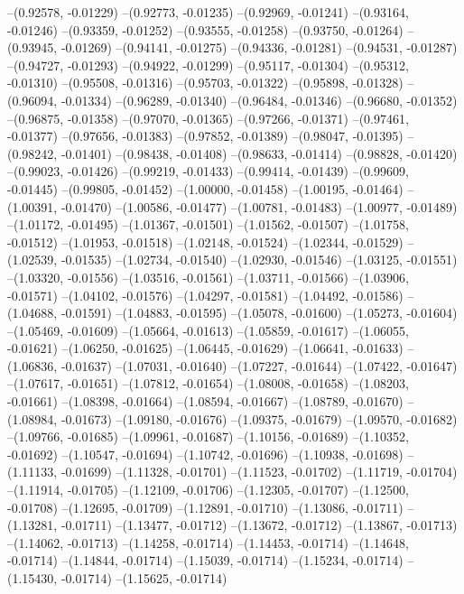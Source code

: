 --(0.92578, -0.01229)
--(0.92773, -0.01235)
--(0.92969, -0.01241)
--(0.93164, -0.01246)
--(0.93359, -0.01252)
--(0.93555, -0.01258)
--(0.93750, -0.01264)
--(0.93945, -0.01269)
--(0.94141, -0.01275)
--(0.94336, -0.01281)
--(0.94531, -0.01287)
--(0.94727, -0.01293)
--(0.94922, -0.01299)
--(0.95117, -0.01304)
--(0.95312, -0.01310)
--(0.95508, -0.01316)
--(0.95703, -0.01322)
--(0.95898, -0.01328)
--(0.96094, -0.01334)
--(0.96289, -0.01340)
--(0.96484, -0.01346)
--(0.96680, -0.01352)
--(0.96875, -0.01358)
--(0.97070, -0.01365)
--(0.97266, -0.01371)
--(0.97461, -0.01377)
--(0.97656, -0.01383)
--(0.97852, -0.01389)
--(0.98047, -0.01395)
--(0.98242, -0.01401)
--(0.98438, -0.01408)
--(0.98633, -0.01414)
--(0.98828, -0.01420)
--(0.99023, -0.01426)
--(0.99219, -0.01433)
--(0.99414, -0.01439)
--(0.99609, -0.01445)
--(0.99805, -0.01452)
--(1.00000, -0.01458)
--(1.00195, -0.01464)
--(1.00391, -0.01470)
--(1.00586, -0.01477)
--(1.00781, -0.01483)
--(1.00977, -0.01489)
--(1.01172, -0.01495)
--(1.01367, -0.01501)
--(1.01562, -0.01507)
--(1.01758, -0.01512)
--(1.01953, -0.01518)
--(1.02148, -0.01524)
--(1.02344, -0.01529)
--(1.02539, -0.01535)
--(1.02734, -0.01540)
--(1.02930, -0.01546)
--(1.03125, -0.01551)
--(1.03320, -0.01556)
--(1.03516, -0.01561)
--(1.03711, -0.01566)
--(1.03906, -0.01571)
--(1.04102, -0.01576)
--(1.04297, -0.01581)
--(1.04492, -0.01586)
--(1.04688, -0.01591)
--(1.04883, -0.01595)
--(1.05078, -0.01600)
--(1.05273, -0.01604)
--(1.05469, -0.01609)
--(1.05664, -0.01613)
--(1.05859, -0.01617)
--(1.06055, -0.01621)
--(1.06250, -0.01625)
--(1.06445, -0.01629)
--(1.06641, -0.01633)
--(1.06836, -0.01637)
--(1.07031, -0.01640)
--(1.07227, -0.01644)
--(1.07422, -0.01647)
--(1.07617, -0.01651)
--(1.07812, -0.01654)
--(1.08008, -0.01658)
--(1.08203, -0.01661)
--(1.08398, -0.01664)
--(1.08594, -0.01667)
--(1.08789, -0.01670)
--(1.08984, -0.01673)
--(1.09180, -0.01676)
--(1.09375, -0.01679)
--(1.09570, -0.01682)
--(1.09766, -0.01685)
--(1.09961, -0.01687)
--(1.10156, -0.01689)
--(1.10352, -0.01692)
--(1.10547, -0.01694)
--(1.10742, -0.01696)
--(1.10938, -0.01698)
--(1.11133, -0.01699)
--(1.11328, -0.01701)
--(1.11523, -0.01702)
--(1.11719, -0.01704)
--(1.11914, -0.01705)
--(1.12109, -0.01706)
--(1.12305, -0.01707)
--(1.12500, -0.01708)
--(1.12695, -0.01709)
--(1.12891, -0.01710)
--(1.13086, -0.01711)
--(1.13281, -0.01711)
--(1.13477, -0.01712)
--(1.13672, -0.01712)
--(1.13867, -0.01713)
--(1.14062, -0.01713)
--(1.14258, -0.01714)
--(1.14453, -0.01714)
--(1.14648, -0.01714)
--(1.14844, -0.01714)
--(1.15039, -0.01714)
--(1.15234, -0.01714)
--(1.15430, -0.01714)
--(1.15625, -0.01714)
